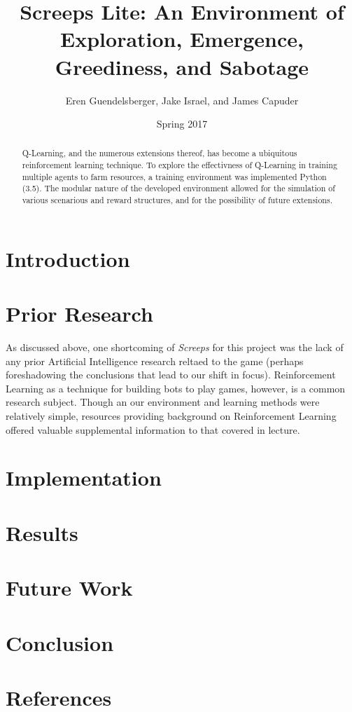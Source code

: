 \documentclass[11pt]{article}
\title{Screeps Lite: An Environment of Exploration, Emergence, Greediness, and Sabotage}
\author{Eren Guendelsberger, Jake Israel, and James Capuder}
\date{Spring 2017}
\begin{document}
\maketitle
\thispagestyle{plain}

\begin{abstract}
Q-Learning, and the numerous extensions thereof, has become a ubiquitous reinforcement learning technique. To explore the effectivness of Q-Learning in training multiple agents to farm resources, a training environment was implemented Python (3.5). The modular nature of the developed environment allowed for the simulation of various scenarious and reward structures, and for the possibility of future extensions.
\end{abstract}

\section{Introduction}

\section{Prior Research}

As discussed above, one shortcoming of \textit{Screeps} for this project was the lack of any prior Artificial Intelligence research reltaed to the game (perhaps foreshadowing the conclusions that lead to our shift in focus). Reinforcement Learning as a technique for building bots to play games, however, is a common research subject. Though an our environment and learning methods were relatively simple, resources providing background on Reinforcement Learning offered valuable supplemental information to that covered in lecture.

\section{Implementation}


\section{Results}

\section{Future Work}

\section{Conclusion}

\section{References}


\end{document}
